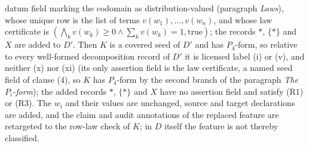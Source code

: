 \begin{proposition}
datum field marking the codomain as distribution-valued (paragraph
\emph{Laws}), whose unique row is the list of terms
\(v(w_1),\dots,v(w_n)\), and whose law certificate is
\((\bigwedge_k v(w_k)\ge0\wedge\sum_k v(w_k)=1,\mathrm{true})\); the records
\(*\), \(\{*\}\) and \(X\) are added to \(D'\).
Then \(K\) is a covered \Pfour{} seed of \(D'\) and has \(P_4\)-form, so
relative to every well-formed decomposition record of \(D'\) it is licensed
label (i) or (v), and neither (x) nor (xi) (its only assertion field is the
law certificate, a named seed field of clause (4), so \(K\) has \(P_4\)-form by
the second branch of the paragraph \emph{The \(P_i\)-form}); the added records \(*\),
\(\{*\}\) and \(X\) have no assertion field and satisfy (R1) or (R3). The \(w_i\) and their values are
unchanged, source and target declarations are added, and the claim and audit
annotations of the replaced feature are retargeted to the row-law check of
\(K\); in \(D\) itself the feature is not thereby classified.
\end{proposition}

